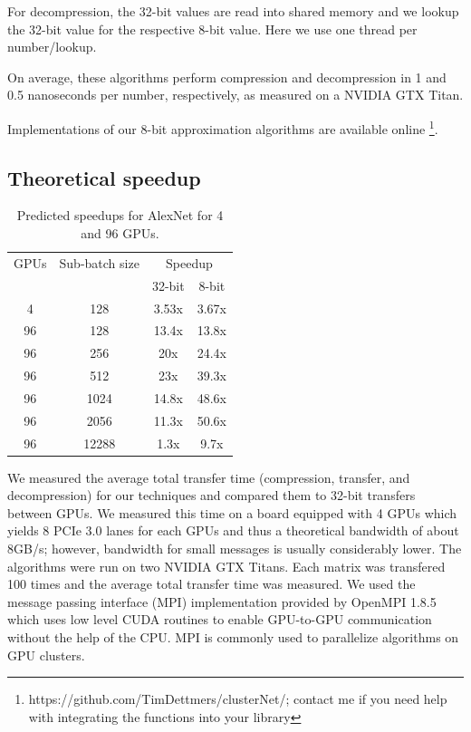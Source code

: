 \documentclass{article} %
\begin{document}
For decompression, the 32-bit values are read into shared memory and we lookup the 32-bit value for the respective 8-bit value. Here we use one thread per number/lookup.

On average, these algorithms perform compression and decompression in 1 and 0.5 nanoseconds per number, respectively, as measured on a NVIDIA GTX Titan.

Implementations of our 8-bit approximation algorithms are available online \footnote{https://github.com/TimDettmers/clusterNet/; contact me if you need help with integrating the functions into your library}.

\subsection{Theoretical speedup}
\begin{table}[h]
	\caption{Predicted speedups for AlexNet for 4 and 96 GPUs.}
	\label{sample-table}
	\begin{minipage}
		{\linewidth}
		\centering
		\begin{tabular}{ cccc}
			\toprule[1.5pt]
			GPUs &  Sub-batch size &   \multicolumn{2}{c}{Speedup}    \\		 
			& &    32-bit & 8-bit		 \\
			\midrule
			4 & 128 & 3.53x & 3.67x \\
			96 & 128 & 13.4x & 13.8x		\\
			96 & 256 & 20x & 24.4x \\	
			96 & 512  & 23x & 39.3x \\		
			96 & 1024 & 14.8x & 48.6x \\			
			96 & 2056 & 11.3x & 50.6x \\	
			96 & 12288 & 1.3x & 9.7x	\\			
			\bottomrule[1.25pt]
		\end{tabular}
		\par
		\bigskip
	\end{minipage}
\end{table}


We measured the average total transfer time (compression, transfer, and decompression) for our techniques and compared them to 32-bit transfers between GPUs. We measured this time on a board equipped with 4 GPUs which yields 8 PCIe 3.0 lanes for each GPUs and thus a theoretical bandwidth of about 8GB/s; however, bandwidth for small messages is usually considerably lower. The algorithms were run on two NVIDIA GTX Titans. Each matrix was transfered 100 times and the average total transfer time was measured. We used the message passing interface (MPI) implementation provided by OpenMPI 1.8.5 which uses low level CUDA routines to enable GPU-to-GPU communication without the help of the CPU. MPI is commonly used to parallelize algorithms on GPU clusters.
\end{document}
